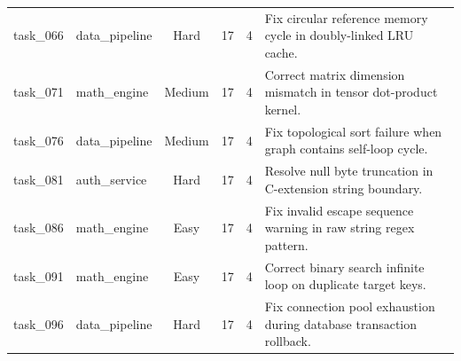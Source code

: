 \begin{table}[t]
\begin{tabular}{llcccl}
task\_066 & data\_pipeline & Hard & 17 & 4 & Fix circular reference memory cycle in doubly-linked LRU cache. \\
task\_071 & math\_engine & Medium & 17 & 4 & Correct matrix dimension mismatch in tensor dot-product kernel. \\
task\_076 & data\_pipeline & Medium & 17 & 4 & Fix topological sort failure when graph contains self-loop cycle. \\
task\_081 & auth\_service & Hard & 17 & 4 & Resolve null byte truncation in C-extension string boundary. \\
task\_086 & math\_engine & Easy & 17 & 4 & Fix invalid escape sequence warning in raw string regex pattern. \\
task\_091 & math\_engine & Easy & 17 & 4 & Correct binary search infinite loop on duplicate target keys. \\
task\_096 & data\_pipeline & Hard & 17 & 4 & Fix connection pool exhaustion during database transaction rollback. \\
\bottomrule
\end{tabular}
\end{table}


